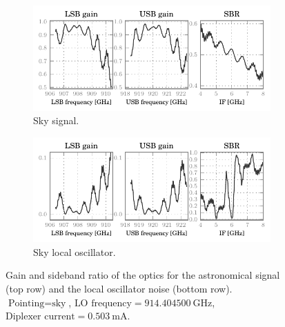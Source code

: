\begin{figure}
    \centering
    \begin{subfigure}[b]{\textwidth}
        \centering
        \includegraphics{87_00_00_sky_s_lsbusbsbr}
        \vspace{-.8em}
        \caption{Sky signal.}
    \end{subfigure}
    \begin{subfigure}[b]{\textwidth}
        \centering
        \includegraphics{87_00_00_sky_l_lsbusbsbr}
        \vspace{-.8em}
        \caption{Sky local oscillator.}
    \end{subfigure}
    \caption{Gain and sideband ratio of the optics for the astronomical signal (top row) and the local oscillator noise (bottom row).
    $\text{Pointing} = \text{sky}$,
    $\text{LO frequency} = \SI{914.404500}{\giga\hertz}$,
    $\text{Diplexer current} = \SI{0.503}{\milli\ampere}$.
    }
    \label{fig:87_00_00_sky_lsbusbsbr}
\end{figure}
